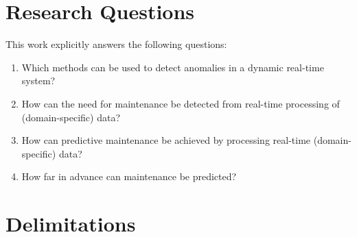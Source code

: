 
\section{Research Questions}
\label{sec:research-questions}
This work explicitly answers the following questions:
\begin{enumerate}
  \item Which methods can be used to detect anomalies in a dynamic real-time system?
  \item How can the need for maintenance be detected from real-time processing of (domain-specific) data?
  \item How can predictive maintenance be achieved by processing real-time (domain-specific) data?
  \item How far in advance can maintenance be predicted?
\end{enumerate}

\section{Delimitations}
\label{sec:delimitations}
